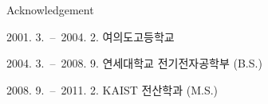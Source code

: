 \documentclass[master,english,final]{kaist-ucs}
\begin{document}




\acknowledgement

Acknowledgement


\curriculumvitae[korean]

    \begin{personaldata}
        \address    {서울특별시 영등포구 여의도동 대교아파트 5동 1213호}
    \end{personaldata}

    \begin{education}
        \item[2001. 3.\ --\ 2004. 2.] 여의도고등학교
        \item[2004. 3.\ --\ 2008. 9.] 연세대학교 전기전자공학부 (B.S.)
        \item[2008. 9.\ --\ 2011. 2.] KAIST 전산학과 (M.S.)
    \end{education}


\end{document}
